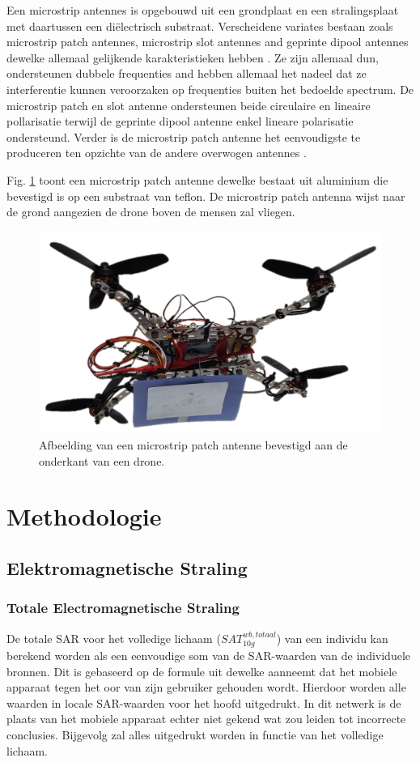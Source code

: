 \documentclass[twocolumn]{phdsymp_dutch}
\begin{document}
Een microstrip antennes is opgebouwd uit een grondplaat en een stralingsplaat met daartussen een di\"electrisch substraat.
Verscheidene variates bestaan zoals microstrip patch antennes, microstrip slot antennes and geprinte dipool antennes 
dewelke allemaal gelijkende karakteristieken hebben \cite{J13_microstripadvantages,J14_antennadesign}. 
Ze zijn allemaal dun, ondersteunen dubbele frequenties and hebben allemaal het nadeel dat 
ze interferentie kunnen veroorzaken op frequenties buiten het bedoelde spectrum. 
De microstrip patch en slot antenne ondersteunen beide circulaire en lineaire pollarisatie terwijl de geprinte dipool antenne enkel 
lineare polarisatie ondersteund. Verder is de microstrip patch antenne het eenvoudigste te produceren ten opzichte 
van de andere overwogen antennes \cite{J13_microstripadvantages}. 

Fig. \ref{fig:exampleDrone} toont een microstrip patch antenne dewelke bestaat 
uit aluminium die bevestigd is op een substraat van teflon. De microstrip patch antenna 
wijst naar de grond aangezien de drone boven de mensen zal vliegen.

\begin{figure}[h]
\centering
  \includegraphics[width=0.5\linewidth]{drone.png}
  \caption{Afbeelding van een microstrip patch antenne bevestigd aan de onderkant van een drone. }
  \label{fig:exampleDrone}
\end{figure}

\section{Methodologie}
\subsection{Elektromagnetische Straling}
\subsubsection{Totale Electromagnetische Straling}
De totale \gls{SAR} voor het volledige lichaam ($SAT^{wb,totaal}_{10g}$) van een individu 
kan berekend worden als een eenvoudige som van de \gls{SAR}-waarden van de individuele bronnen. 
Dit is gebaseerd op de formule uit \cite{J17_kuehn2019modelling} dewelke aanneemt dat het mobiele apparaat 
tegen het oor van zijn gebruiker gehouden wordt. Hierdoor worden alle waarden in locale \gls{SAR}-waarden voor het hoofd uitgedrukt.
In dit netwerk is de plaats van het mobiele apparaat echter  niet  gekend wat zou leiden tot incorrecte conclusies. Bijgevolg 
zal alles uitgedrukt worden in functie van het volledige lichaam.
\end{document}
